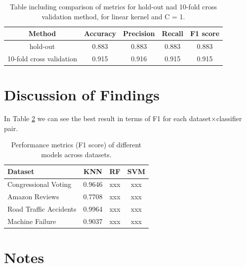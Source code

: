 \documentclass{article}
\begin{document}
\begin{table}[h!]
\centering
\begin{tabular}{||c c c c c||} 
 \hline
Method &  Accuracy & Precision & Recall & F1 score \\ [0.5ex] 
 \hline\hline
hold-out & 0.883 & 0.883 & 0.883 & 0.883  \\  
 10-fold cross validation &  0.915&  0.916 & 0.915& 0.915 \\ [1ex] 
 \hline
\end{tabular}
\caption{Table including comparison of metrics for hold-out nad 10-fold cross validation method, for linear kernel and C = 1.}
\label{table:machine_SVM_cross}
\end{table}

\section{Discussion of Findings}
In Table \ref{tab:model_performance} we can see the best result in terms of F1 for each dataset×classifier pair.

\begin{table}[H]
\centering
\begin{tabular}{l|c|c|c}
\hline
\textbf{Dataset}       & \textbf{KNN} & \textbf{RF} & \textbf{SVM} \\ \hline
Congressional Voting & 0.9646 & xxx & xxx \\ 
Amazon Reviews  & 0.7708 & xxx & xxx \\ 
Road Traffic Accidents & 0.9964 & xxx & xxx \\ 
Machine Failure & 0.9037 & xxx & xxx \\ \hline
\end{tabular}
\caption{Performance metrics (F1 score) of different models across datasets.}
\label{tab:model_performance}
\end{table}



\section{Notes}
\end{document}
